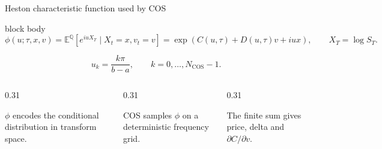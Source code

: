 \begin{frame}[t]{Heston characteristic function used by COS}
  \begin{beamercolorbox}[rounded=true,sep=0.15cm]{block body}
    {\small\[
      \phi(u;\tau,x,v)=\mathbb E^{\mathbb Q}\!\left[e^{iuX_T}\mid X_t=x,v_t=v\right]
      =\exp\!\left(C(u,\tau)+D(u,\tau)v+iux\right),\qquad X_T=\log S_T.
    \]}
  \end{beamercolorbox}
  \vspace{0.12cm}
  \[
    u_k=\frac{k\pi}{b-a},\qquad k=0,\ldots,N_{\mathrm{COS}}-1.
  \]
  \vspace{0.08cm}
  \begin{columns}[T,onlytextwidth]
    \begin{column}{0.31\textwidth}
      \centering{}\par\small \(\phi\) encodes the conditional distribution in transform space.
    \end{column}
    \begin{column}{0.31\textwidth}
      \centering{}\par\small COS samples \(\phi\) on a deterministic frequency grid.
    \end{column}
    \begin{column}{0.31\textwidth}
      \centering{}\par\small The finite sum gives price, delta and \(\partial C/\partial v\).
    \end{column}
  \end{columns}
\end{frame}

